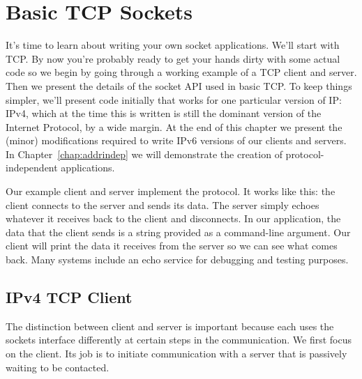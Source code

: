 \chapter{Basic TCP Sockets}
\label{chap:tcp}

It's time to learn about writing your own socket applications.
We'll start with TCP.
By now you're probably ready to get your hands dirty with some
actual code so we begin by going through
a working example of a TCP client and server.
Then we present the details of the socket API used in basic TCP.
To keep things simpler, we'll present code initially that works for
one  particular version of IP: IPv4, which at the time this is written is
still the dominant version of the Internet Protocol, by a wide margin.
At the end of this chapter we present the (minor)
modifications required to write IPv6 versions of our
clients and servers.  In Chapter~\ref{chap:addrindep}
we will demonstrate the creation of protocol-independent applications.

Our example client and server implement the  protocol.  It
works like this: the client connects to the server and sends its data.  The
server simply echoes whatever it receives back to the client and
disconnects.
%
In our application, the data that the client sends is a string provided as a
command-line argument.  Our client will print the data
it receives from the server so we can see 
what comes back.  Many systems include an echo service for debugging
and testing purposes.

\section{IPv4 TCP Client}

The distinction between client and server is important
because each uses the sockets interface differently at certain steps
in the communication.  We first focus on the client.  Its job is to
initiate communication with a server that is passively waiting to be
contacted.  

